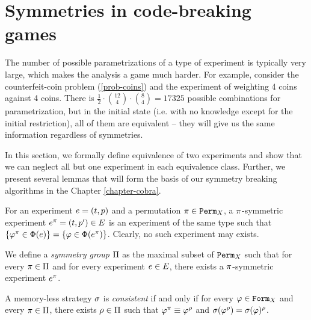 \section{Symmetries in code-breaking games}

The number of possible parametrizations of a type of experiment is typically very large,
  which makes the analysis a game much harder.
For example, consider the counterfeit-coin problem (\ref{prob-coins})
  and the experiment of weighting 4 coins against 4 coins.
There is $\frac{1}{2}\cdot {12 \choose 4}\cdot{8 \choose 4} = 17325$
 possible combinations for parametrization, but
 in the initial state (i.e. with no knowledge except for the initial restriction),
 all of them are equivalent -- they will give us the same information regardless of symmetries.

In this section, we formally define equivalence of two experiments
 and show that we can neglect all but one experiment in each equivalence class.
Further, we present several lemmas that will form the basis of
 our symmetry breaking algorithms in the Chapter \ref{chapter-cobra}.

\begin{definition}
For an experiment $e = (t, p)$ and a permutation $\pi\in\mathtt{Perm}_X$,
  a $\pi$-symmetric experiment $e^\pi = (t, p')\in E$
  is an experiment of the same type such that
  $\{\varphi^\pi \in\Phi(e)\} = \{\varphi\in\Phi(e^\pi)\}$.
Clearly, no such experiment may exists.
\end{definition}

\begin{definition}
We define a \emph{symmetry group} $\Pi$ as
  the maximal subset of $\mathtt{Perm}_X$ such that for
  every $\pi\in\Pi$ and for every experiment $e\in E$,
  there exists a $\pi$-symmetric experiment $e^\pi$.
\end{definition}

\begin{definition}
A memory-less strategy $\sigma$ is \emph{consistent} if and only if
  for every $\varphi\in\mathtt{Form}_X$ and every $\pi\in\Pi$, there
  exists $\rho\in\Pi$ such that $\varphi^\pi \equiv \varphi^\rho$ and
  $\sigma(\varphi^\rho) = \sigma(\varphi)^\rho$.
\end{definition}


